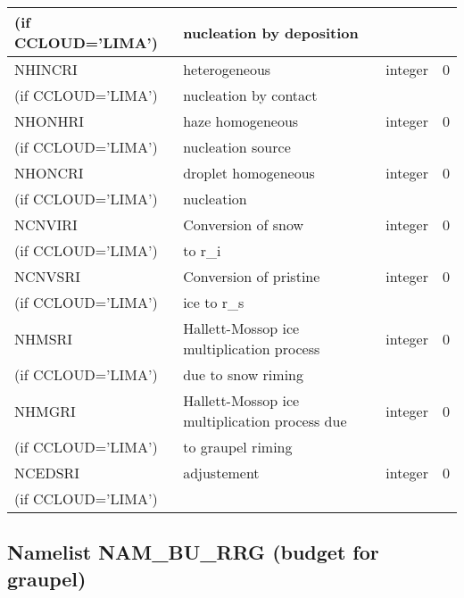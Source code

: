 \begin{center}
\begin{tabular} {|p{8cm}|p{4cm}|>{\centering}p{1.5cm}|p{1.5cm}<{\centering}|}
(if CCLOUD='LIMA') &nucleation by deposition &   &  \\\hline
NHINCRI & heterogeneous     & integer  &  0 \index{NHINCRI!\innam{NAM\_BU\_RRI}}\\
(if CCLOUD='LIMA') &nucleation by contact &   &  \\\hline
NHONHRI & haze homogeneous     & integer  &  0 \index{NHONHRI!\innam{NAM\_BU\_RRI}}\\
(if CCLOUD='LIMA') &  nucleation source&   &  \\\hline
NHONCRI & droplet homogeneous     & integer  &  0 \index{NHONCRI!\innam{NAM\_BU\_RRI}}\\
(if CCLOUD='LIMA') &nucleation &   &  \\\hline
NCNVIRI & Conversion of snow     & integer  &  0 \index{NCNVIRI!\innam{NAM\_BU\_RRI}}\\
(if CCLOUD='LIMA') &to r\_i &   &  \\\hline
NCNVSRI &  Conversion of pristine    & integer  &  0 \index{NCNVSRI!\innam{NAM\_BU\_RRI}}\\
(if CCLOUD='LIMA') &ice to r\_s &   &  \\\hline
NHMSRI &Hallett-Mossop ice multiplication process      & integer  &  0 \index{NHMSRI!\innam{NAM\_BU\_RRI}}\\
(if CCLOUD='LIMA') &due to snow riming &   &  \\\hline
NHMGRI &  Hallett-Mossop ice multiplication process due     & integer  &  0 \index{NHMGRI!\innam{NAM\_BU\_RRI}}\\
(if CCLOUD='LIMA') &to graupel riming &   &  \\\hline
NCEDSRI & adjustement    & integer  &  0 \index{NCEDSRI!\innam{NAM\_BU\_RRI}}\\
(if CCLOUD='LIMA') & &   &  \\\hline
\end{tabular}
\end{center}
\subsection{Namelist NAM\_BU\_RRG (budget for graupel)}


